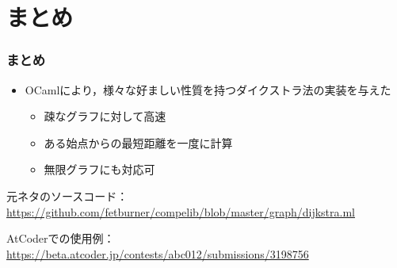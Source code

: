\documentclass[dvipdfmx,cjk,xcolor=dvipsnames,envcountsect,notheorems,12pt]{beamer}
\theoremstyle{definition}
\begin{document}
\section*{まとめ}

\begin{frame}
	\vspace{-7mm}
	\frametitle{まとめ}
	\begin{itemize}
		\item OCamlにより，様々な好ましい性質を持つダイクストラ法の実装を与えた
			\begin{itemize}
				\item 疎なグラフに対して高速
				\item ある始点からの最短距離を一度に計算
				\item 無限グラフにも対応可
			\end{itemize}
	\end{itemize}

	\vfill

	{\large 元ネタのソースコード：}
	\url{https://github.com/fetburner/compelib/blob/master/graph/dijkstra.ml}
	
	\vfill

	{\large AtCoderでの使用例：}
	\url{https://beta.atcoder.jp/contests/abc012/submissions/3198756}
\end{frame}
\end{document}
